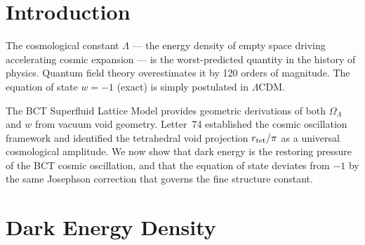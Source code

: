 \documentclass[aps,prl,twocolumn,showpacs,superscriptaddress]{revtex4-2}
\begin{document}
\begin{abstract}
We derive the dark energy density parameter and equation of state from BCT vacuum 
geometry. The cosmological density parameter is $\Omega_\Lambda = 2/3 + r_{\rm tet}/\pi 
= 0.7024$ (observed $0.6889$, error $+1.96\%$), where $2/3$ represents equipartition 
across three spatial dimensions and $r_{\rm tet}/\pi$ is the tetrahedral void projection 
--- the same factor governing large-scale peculiar velocities and standing wave nodes 
(Letter~74). The dark energy equation of state deviates from $w=-1$ by the Josephson 
self-correction: $w = -(1-2\alpha_0) = -0.9852$, giving $\Delta w = 2\alpha_0 = 1.48\%$. 
This is the identical correction that relates the bare BCT coupling $\alpha_0$ to the 
fine structure constant $\alpha = \alpha_0(1-2\alpha_0)$ (Letter~1). The BCT signal 
$\Delta w = 1.48\%$ is within Euclid sensitivity ($\sim 1\%$) and consistent with 
DESI BAO 2024 ($w = -0.99 \pm 0.05$). If Euclid confirms $w \approx -0.985$ rather 
than $-1$, standard $\Lambda$CDM is falsified and BCT is vindicated.
\end{abstract}

\maketitle

\section{Introduction}

The cosmological constant $\Lambda$ --- the energy density of empty space driving 
accelerating cosmic expansion --- is the worst-predicted quantity in the history 
of physics. Quantum field theory overestimates it by 120 orders of magnitude. The 
equation of state $w = -1$ (exact) is simply postulated in $\Lambda$CDM.

The BCT Superfluid Lattice Model provides geometric derivations of both $\Omega_\Lambda$ 
and $w$ from vacuum void geometry. Letter~74 established the cosmic oscillation 
framework and identified the tetrahedral void projection $r_{\rm tet}/\pi$ as a 
universal cosmological amplitude. We now show that dark energy is the restoring 
pressure of the BCT cosmic oscillation, and that the equation of state deviates from 
$-1$ by the same Josephson correction that governs the fine structure constant.

\section{Dark Energy Density}
\end{document}
